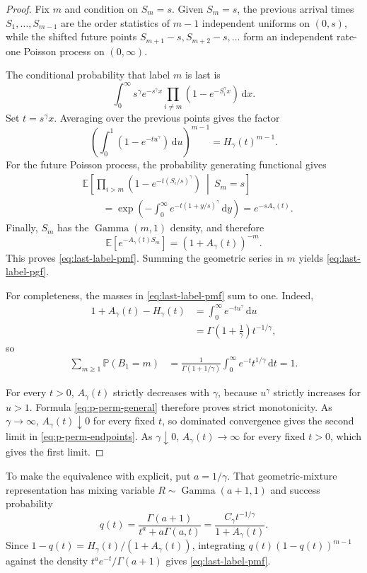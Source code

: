 \documentclass[11pt]{article}
\numberwithin{equation}{section}
\theoremstyle{definition}
\theoremstyle{remark}
\newcommand{\Pp}{\mathbb P}
\newcommand{\Ee}{\mathbb E}
\newcommand{\dd}{\,\mathrm d}
\begin{document}
\begin{proof}
Fix $m$ and condition on $S_m=s$.  Given $S_m=s$, the previous arrival times $S_1,\ldots,S_{m-1}$ are the order statistics of $m-1$ independent uniforms on $(0,s)$, while the shifted future points $S_{m+1}-s,S_{m+2}-s,\ldots$ form an independent rate-one Poisson process on $(0,\infty)$.

The conditional probability that label $m$ is last is
\[
  \int_0^\infty
  s^\gamma e^{-s^\gamma x}
  \prod_{i\neq m}\left(1-e^{-S_i^\gamma x}\right)\dd x.
\]
Set $t=s^\gamma x$.  Averaging over the previous points gives the factor
\[
  \left(\int_0^1(1-e^{-tu^\gamma})\dd u\right)^{m-1}
  =H_\gamma(t)^{m-1}.
\]
For the future Poisson process, the probability generating functional gives
\begin{align*}
 &\Ee\left[
   \prod_{i>m}\left(1-e^{-t(S_i/s)^\gamma}\right)
   \ \middle|\ S_m=s\right]\\
 &\qquad=
 \exp\left(-\int_0^\infty
 e^{-t(1+y/s)^\gamma}\dd y\right)
 =e^{-sA_\gamma(t)}.
\end{align*}
Finally, $S_m$ has the $\operatorname{Gamma}(m,1)$ density, and therefore
\[
  \Ee[e^{-A_\gamma(t)S_m}]=(1+A_\gamma(t))^{-m}.
\]
This proves \eqref{eq:last-label-pmf}.  Summing the geometric series in $m$ yields \eqref{eq:last-label-pgf}.

For completeness, the masses in \eqref{eq:last-label-pmf} sum to one.  Indeed,
\begin{align*}
  1+A_\gamma(t)-H_\gamma(t)
  &=\int_0^\infty e^{-tu^\gamma}\dd u\\
  &=\Gamma\!\left(1+\frac1\gamma\right)t^{-1/\gamma},
\end{align*}
so
\begin{align*}
  \sum_{m\geq1}\Pp(B_1=m)
  &=\frac1{\Gamma(1+1/\gamma)}
    \int_0^\infty e^{-t}t^{1/\gamma}\dd t
  =1.
\end{align*}

For every $t>0$, $A_\gamma(t)$ strictly decreases with $\gamma$, because $u^\gamma$ strictly increases for $u>1$.  Formula \eqref{eq:p-perm-general} therefore proves strict monotonicity.  As $\gamma\to\infty$, $A_\gamma(t)\downarrow0$ for every fixed $t$, so dominated convergence gives the second limit in \eqref{eq:p-perm-endpoints}.  As $\gamma\downarrow0$, $A_\gamma(t)\to\infty$ for every fixed $t>0$, which gives the first limit.
\end{proof}

To make the equivalence with \cite[Proposition~26]{PitmanTran} explicit, put $a=1/\gamma$.  That geometric-mixture representation has mixing variable $R\sim\operatorname{Gamma}(a+1,1)$ and success probability
\[
  q(t)=\frac{\Gamma(a+1)}{t^a+a\Gamma(a,t)}
      =\frac{C_\gamma t^{-1/\gamma}}{1+A_\gamma(t)}.
\]
Since $1-q(t)=H_\gamma(t)/(1+A_\gamma(t))$, integrating
$q(t)(1-q(t))^{m-1}$ against the density
$t^a e^{-t}/\Gamma(a+1)$ gives \eqref{eq:last-label-pmf}.
\end{document}
